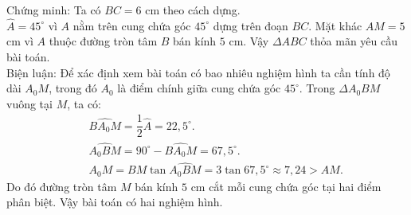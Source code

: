 \begin{bt}
{\begin{enumerate}
{}
Chứng minh: Ta có
$BC=6$ cm theo cách dựng.\\
$\widehat{A}=45^\circ$ vì $A$ nằm trên cung chứa góc $45^\circ$ dựng trên đoạn $BC$. Mặt khác
$AM=5$ cm vì $A$ thuộc đường tròn tâm $B$ bán kính $5$ cm.
Vậy $\Delta ABC$ thỏa mãn yêu cầu bài toán.\\
Biện luận: Để xác định xem bài toán có bao nhiêu nghiệm hình ta cần tính độ dài $A_0M$, trong đó $A_0$ là điểm chính giữa cung chứa góc $45^\circ$.
Trong $\Delta A_0BM$ vuông tại $M$, ta có:
{\allowdisplaybreaks
	\begin{eqnarray*}
&&\widehat{BA_0M}=\dfrac{1}{2}\widehat{A}=22{,}5^\circ.\\
&&\widehat{A_0BM}=90^\circ-\widehat{BA_0M}=67{,}5^\circ.\\
&&A_0M=BM\tan \widehat{A_0BM}=3\tan 67{,}5^\circ \approx 7,24 >AM.
\end{eqnarray*}}
\noindent
Do đó đường tròn tâm $M$ bán kính $5$ cm cắt mỗi cung chứa góc tại hai điểm phân biệt. Vậy bài toán có hai nghiệm hình.
\end{enumerate}
	}
\end{bt}
